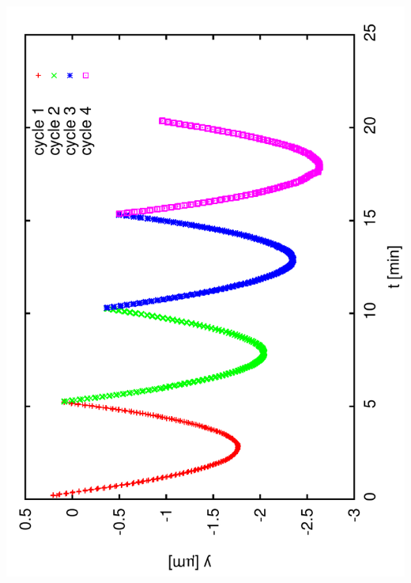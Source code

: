 \documentclass[a4paper,11pt]{book}
\begin{document}
\includegraphics[angle=-90,scale=0.15]{image41.pdf}
\end{document}
